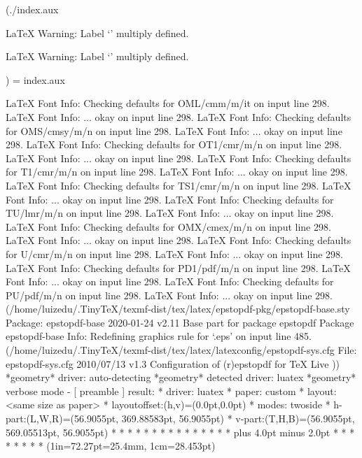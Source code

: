 (./index.aux

LaTeX Warning: Label `' multiply defined.


LaTeX Warning: Label `' multiply defined.

)
 = index.aux

LaTeX Font Info:    Checking defaults for OML/cmm/m/it on input line 298.
LaTeX Font Info:    ... okay on input line 298.
LaTeX Font Info:    Checking defaults for OMS/cmsy/m/n on input line 298.
LaTeX Font Info:    ... okay on input line 298.
LaTeX Font Info:    Checking defaults for OT1/cmr/m/n on input line 298.
LaTeX Font Info:    ... okay on input line 298.
LaTeX Font Info:    Checking defaults for T1/cmr/m/n on input line 298.
LaTeX Font Info:    ... okay on input line 298.
LaTeX Font Info:    Checking defaults for TS1/cmr/m/n on input line 298.
LaTeX Font Info:    ... okay on input line 298.
LaTeX Font Info:    Checking defaults for TU/lmr/m/n on input line 298.
LaTeX Font Info:    ... okay on input line 298.
LaTeX Font Info:    Checking defaults for OMX/cmex/m/n on input line 298.
LaTeX Font Info:    ... okay on input line 298.
LaTeX Font Info:    Checking defaults for U/cmr/m/n on input line 298.
LaTeX Font Info:    ... okay on input line 298.
LaTeX Font Info:    Checking defaults for PD1/pdf/m/n on input line 298.
LaTeX Font Info:    ... okay on input line 298.
LaTeX Font Info:    Checking defaults for PU/pdf/m/n on input line 298.
LaTeX Font Info:    ... okay on input line 298.
(/home/luizedu/.TinyTeX/texmf-dist/tex/latex/epstopdf-pkg/epstopdf-base.sty
Package: epstopdf-base 2020-01-24 v2.11 Base part for package epstopdf
Package epstopdf-base Info: Redefining graphics rule for `.eps' on input line 485.
(/home/luizedu/.TinyTeX/texmf-dist/tex/latex/latexconfig/epstopdf-sys.cfg
File: epstopdf-sys.cfg 2010/07/13 v1.3 Configuration of (r)epstopdf for TeX Live
))
*geometry* driver: auto-detecting
*geometry* detected driver: luatex
*geometry* verbose mode - [ preamble ] result:
* driver: luatex
* paper: custom
* layout: <same size as paper>
* layoutoffset:(h,v)=(0.0pt,0.0pt)
* modes: twoside 
* h-part:(L,W,R)=(56.9055pt, 369.88583pt, 56.9055pt)
* v-part:(T,H,B)=(56.9055pt, 569.05513pt, 56.9055pt)
* \paperwidth=483.69684pt
* \paperheight=682.86613pt
* \textwidth=369.88583pt
* \textheight=569.05513pt
* \oddsidemargin=-15.36449pt
* \evensidemargin=-15.36449pt
* \topmargin=-45.43198pt
* \headheight=12.0pt
* \headsep=18.06749pt
* \topskip=10.0pt
* \footskip=25.29494pt
* \marginparwidth=125.0pt
* \marginparsep=7.0pt
* \columnsep=10.0pt
* \skip\footins=9.0pt plus 4.0pt minus 2.0pt
* \hoffset=0.0pt
* \voffset=0.0pt
* 
* \@twocolumnfalse
* \@twosidetrue
* \@mparswitchtrue
* \@reversemarginfalse
* (1in=72.27pt=25.4mm, 1cm=28.453pt)

